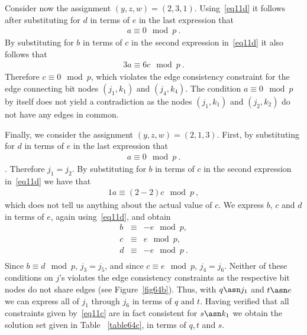 Consider now the assignment $(y,z,w)=(2,3,1)$. Using~\eqref{eq11d}
it follows after substituting for $d$ in terms of $e$ in the last
expression that
\begin{eqnarray}
a \equiv 0 \mod p~.
\end{eqnarray}
By substituting for $b$ in terms of $c$ in the second expression
in~\eqref{eq11d} it also follows that
\begin{eqnarray}
3a \equiv 6c \mod p~.
\end{eqnarray}
Therefore $c \equiv 0 \mod p$, which violates the edge consistency
constraint for the edge connecting bit nodes $(j_1,k_1)$ and
$(j_4,k_4)$. The condition $a \equiv 0 \mod p$ by itself does not
yield a contradiction as the nodes $(j_1,k_1)$ and $(j_2,k_2)$ do
not have any edges in common.

Finally, we consider the assignment $(y,z,w)=(2,1,3)$. First, by
substituting for $d$ in terms of $e$ in the last expression that
\begin{eqnarray}
a \equiv 0 \mod p~.
\end{eqnarray}.
Therefore $j_1=j_2$. By substituting for $b$ in terms of $c$ in
the second expression in~\eqref{eq11d} we have that
\begin{eqnarray}
1a \equiv (2-2)c \mod p~,
\end{eqnarray}
which does not tell us anything about the actual value of $c$. We
express $b$, $c$ and $d$ in terms of $e$, again
using~\eqref{eq11d}, and obtain
\begin{equation}\label{eq11g}\begin{array}{cccc}
b &\equiv & -e \mod p, \\
c &\equiv & e \mod p, \\
d &\equiv & -e \mod p~. \\
\end{array}\end{equation}
Since $b \equiv d \mod p$, $j_3=j_5$, and since $c \equiv e \mod
p$, $j_4=j_6$. Neither of these conditions on $j$'s violates the
edge consistency constraints as the respective bit nodes do not
share edges (see Figure~\ref{fig64b}). Thus, with $q \asn j_1$ and
$t \asn e$ we can express all of $j_1$ through $j_6$ in terms of
$q$ and $t$. Having verified that all constraints given
by~\eqref{eq11c} are in fact consistent for $s \asn k_1$ we obtain
the solution set given in Table ~\ref{table64c}, in terms of $q,t$
and $s$.

